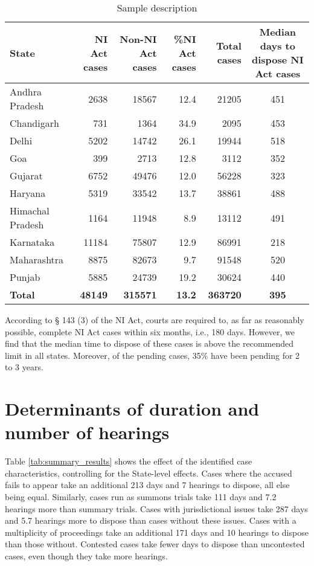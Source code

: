 \documentclass[11pt,a4paper]{article}
\begin{document}
{\footnotesize \begin{longtable}{@{}lrrrr|c@{}}
\caption{Sample description}
\label{tab:sample_desc}\\
\toprule
\textbf{State} & \multicolumn{1}{p{1.5cm}}{\textbf{NI Act cases}} & \multicolumn{1}{p{1.5cm}}{\textbf{Non-NI Act cases}} & \multicolumn{1}{p{1.5cm}}{\textbf{\%NI Act cases}} & \textbf{Total cases} & \multicolumn{1}{p{3cm}}{\textbf{Median days to dispose NI Act cases}}\\ \midrule
\endhead
Andhra Pradesh & 2638 & 18567 & 12.4 & 21205 & 451\\
Chandigarh & 731 & 1364 & 34.9 & 2095 & 453\\
Delhi & 5202 & 14742 & 26.1 & 19944 & 518\\
Goa & 399 & 2713 & 12.8 & 3112 & 352\\
Gujarat & 6752 & 49476 & 12.0 & 56228 & 323\\
Haryana & 5319 & 33542 & 13.7 & 38861 & 488\\
Himachal Pradesh & 1164 & 11948 & 8.9 & 13112 & 491\\
Karnataka & 11184 & 75807 & 12.9 & 86991 & 218\\
Maharashtra & 8875 & 82673 & 9.7 & 91548 & 520\\
Punjab & 5885 & 24739 & 19.2 & 30624 & 440\\
\midrule
\textbf{Total} & \textbf{48149} & \textbf{315571} & \textbf{13.2} & \textbf{363720} & \textbf{395}\\ \bottomrule
\end{longtable}
}

According to § 143 (3) of the NI Act, courts are required to, as far as reasonably possible, complete NI Act cases within six months, i.e., 180 days. However, we find that the median time to dispose of these cases is above the recommended limit in all states. Moreover, of the pending cases, 35\% have been pending for 2 to 3 years.

\section{Determinants of duration and number of hearings}

Table \ref{tab:summary_results} shows the effect of the identified case characteristics, controlling for the State-level effects. Cases where the accused fails to appear take an additional 213 days and 7 hearings to dispose, all else being equal. Similarly, cases run as summons trials take 111 days and 7.2 hearings more than summary trials. Cases with jurisdictional issues take 287 days and 5.7 hearings more to dispose than cases without these issues. Cases with a multiplicity of proceedings take an additional 171 days and 10 hearings to dispose than those without. Contested cases take fewer days to dispose than uncontested cases, even though they take more hearings.
\end{document}

